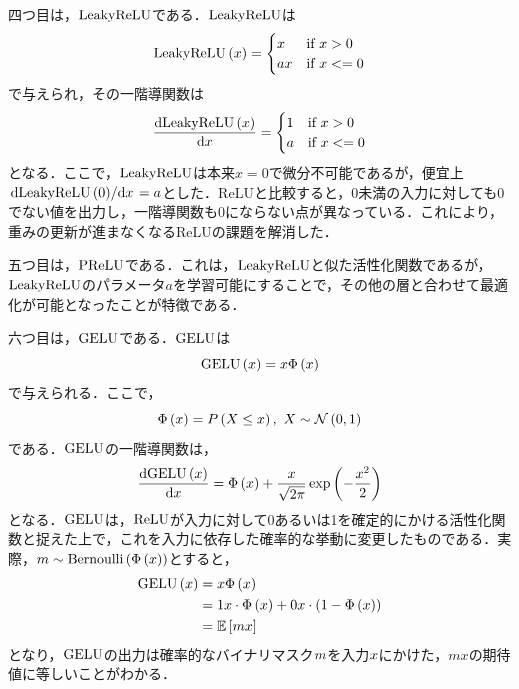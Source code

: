 四つ目は，$\text{LeakyReLU}$\cite{maas2013rectifier}である．$\text{LeakyReLU}$は
\begin{equation}
    \text{LeakyReLU}\left(x\right) =
    \begin{cases}
        x  & \text{if $x > 0$}  \\
        ax & \text{if $x <= 0$}
    \end{cases}
\end{equation}
で与えられ，その一階導関数は
\begin{equation}
    \dv{\text{LeakyReLU}\left(x\right)}{x} =
    \begin{cases}
        1 & \text{if $x > 0$}  \\
        a & \text{if $x <= 0$}
    \end{cases}
\end{equation}
となる．ここで，$\text{LeakyReLU}$は本来$x = 0$で微分不可能であるが，便宜上$\dv*{\text{LeakyReLU}\left(0\right)}{x} = a$とした．ReLUと比較すると，0未満の入力に対しても0でない値を出力し，一階導関数も0にならない点が異なっている．これにより，重みの更新が進まなくなるReLUの課題を解消した．

五つ目は，$\text{PReLU}$\cite{he2015delving}である．これは，$\text{LeakyReLU}$と似た活性化関数であるが，$\text{LeakyReLU}$のパラメータ$a$を学習可能にすることで，その他の層と合わせて最適化が可能となったことが特徴である．

六つ目は，$\text{GELU}$\cite{hendrycks2016gaussian}である．$\text{GELU}$は
\begin{equation}
    \text{GELU}\left(x\right) = x \Phi\left(x\right)
\end{equation}
で与えられる．ここで，
\begin{equation}
    \Phi\left(x\right) = P\left(X \le x\right), ~ X \sim \mathcal{N} \left(0, 1\right)
\end{equation}
である．$\text{GELU}$の一階導関数は，
\begin{equation}
    \dv{\text{GELU}\left(x\right)}{x} = \Phi\left(x\right) + \frac{x}{\sqrt{2\pi}}\exp\left(-\frac{x^{2}}{2}\right)
\end{equation}
となる．$\text{GELU}$は，$\text{ReLU}$が入力に対して0あるいは1を確定的にかける活性化関数と捉えた上で，これを入力に依存した確率的な挙動に変更したものである．実際，$m \sim \text{Bernoulli}\left(\Phi\left(x\right)\right)$とすると，
\begin{align}
    \text{GELU}\left(x\right) & = x \Phi\left(x\right)                                                             \\
                          & = 1 x \cdot \Phi\left(x\right) + 0 x \cdot \left(1 - \Phi\left(x\right)\right) \\
                          & = \mathbb{E}\left[mx\right]
\end{align}
となり，$\text{GELU}$の出力は確率的なバイナリマスク$m$を入力$x$にかけた，$mx$の期待値に等しいことがわかる．

